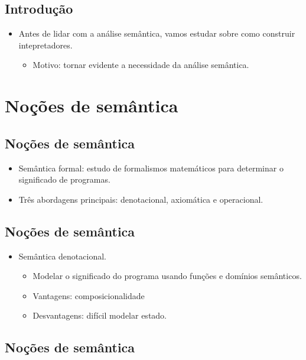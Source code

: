 \documentclass[11pt]{article}
\begin{document}
\subsection*{Introdução}
\label{sec:org75d987a}

\begin{itemize}
\item Antes de lidar com a análise semântica, vamos estudar sobre como construir intepretadores.
\begin{itemize}
\item Motivo: tornar evidente a necessidade da análise semântica.
\end{itemize}
\end{itemize}
\section*{Noções de semântica}
\label{sec:org228be1c}

\subsection*{Noções de semântica}
\label{sec:org5a36c98}

\begin{itemize}
\item Semântica formal: estudo de formalismos matemáticos para determinar o significado de programas.

\item Três abordagens principais: denotacional, axiomática e operacional.
\end{itemize}
\subsection*{Noções de semântica}
\label{sec:org4ac8457}

\begin{itemize}
\item Semântica denotacional.
\begin{itemize}
\item Modelar o significado do programa usando funções e domínios semânticos.
\item Vantagens: composicionalidade
\item Desvantagens: difícil modelar estado.
\end{itemize}
\end{itemize}
\subsection*{Noções de semântica}
\label{sec:org1955944}
\end{document}
